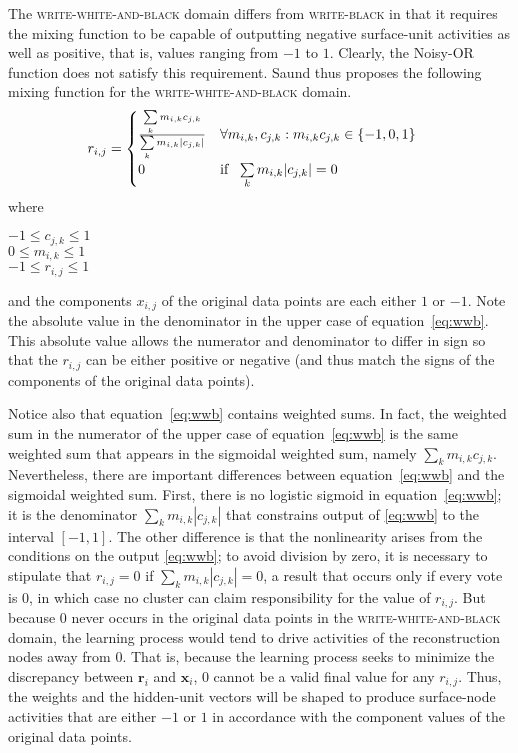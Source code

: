 The \textsc{write-white-and-black} domain differs from \textsc{write-black} 
in that it requires the mixing function to be capable of outputting negative surface-unit 
activities as well as positive, that is, values ranging from $-1$ to $1$.
Clearly, the Noisy-OR function does not satisfy this requirement.
Saund thus proposes the following mixing function for the \textsc{write-white-and-black} domain.
 \begin{align}\label{eq:wwb}
  r_{i,j} &=
    \begin{cases}
      \frac{\sum\limits_{k} m_{i,k} c_{j,k}}{\sum\limits_{k} m_{i,k} |c_{j,k}|} & \text{$\forall m_{i,k}, c_{j,k} : m_{i,k} c_{j,k} \in \{-1,0,1\}$} \\
      0 & \text{if \, $\sum\limits_{k} m_{i,k} |c_{j,k}|= 0$} 
    \end{cases}
 \end{align}
where 
\begin{center}
$-1 \leq c_{j,k} \leq 1$  \\
$0 \leq  m_{i,k} \leq  1$\\
$-1 \leq  r_{i,j} \leq  1$ 
\end{center}
and the components $x_{i,j}$ of the original data points
are each either $1$ or  $-1$. Note the absolute value in the denominator in the 
upper case of equation~\eqref{eq:wwb}. 
This absolute value allows the numerator and denominator to differ in sign so that 
the $r_{i,j}$ can be either positive or negative (and thus match the signs of the components of the original data points).

 Notice also that equation~\eqref{eq:wwb} contains weighted sums. In fact, the weighted sum
in the numerator of the upper case of equation~\eqref{eq:wwb} is the same weighted sum that appears in the sigmoidal weighted sum, namely $\sum\limits_{k} m_{i,k} c_{j,k}$.
 Nevertheless, there are important differences 
 between equation~\eqref{eq:wwb} and the sigmoidal weighted sum. First, there is 
 no logistic sigmoid in equation~\eqref{eq:wwb}; it is the denominator $\sum_{k} m_{i,k} |c_{j,k}|$ 
 that constrains output of \eqref{eq:wwb} to the interval $[-1,1]$. The other 
 difference is that the nonlinearity arises from the conditions on the output \eqref{eq:wwb}; 
 to avoid division by zero, it is necessary to stipulate that $r_{i,j}=0$ if 
 $\sum_{k} m_{i,k} |c_{j,k}| = 0$, a result that occurs only if every vote is 0, 
 in which case no cluster can claim responsibility for the value of $r_{i,j}$. But 
 because $0$ never occurs in the original data points in the \textsc{write-white-and-black} 
 domain, the learning process would tend to drive activities of the reconstruction nodes 
 away from $0$. That is, because the learning process seeks to minimize the discrepancy 
 between $\textbf{r}_i$ and $\textbf{x}_i$, $0$ cannot be a valid final value for any $r_{i,j}$.  
 Thus, the weights and the hidden-unit vectors will be shaped to produce surface-node 
 activities that are either $-1$ or $1$ in accordance with the component values of 
 the original data points. 

